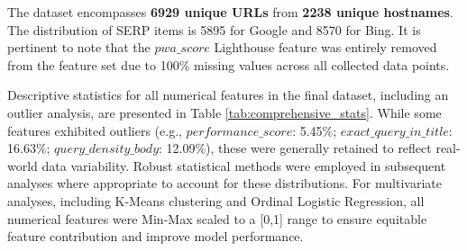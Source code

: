 \documentclass[a4paper,fleqn]{cas-sc}
\begin{document}
The dataset encompasses \textbf{\num{6929} unique URLs} from \textbf{\num{2238} unique hostnames}. The distribution of SERP items is \num{5895} for Google and \num{8570} for Bing. It is pertinent to note that the $pwa\_score$ Lighthouse feature was entirely removed from the feature set due to 100\% missing values across all collected data points.

Descriptive statistics for all numerical features in the final dataset, including an outlier analysis, are presented in Table \ref{tab:comprehensive_stats}. While some features exhibited outliers (e.g., $performance\_score$: 5.45\%; $exact\_query\_in\_title$: 16.63\%; $query\_density\_body$: 12.09\%), these were generally retained to reflect real-world data variability. Robust statistical methods were employed in subsequent analyses where appropriate to account for these distributions. For multivariate analyses, including K-Means clustering and Ordinal Logistic Regression, all numerical features were Min-Max scaled to a [0,1] range to ensure equitable feature contribution and improve model performance.
\end{document}
